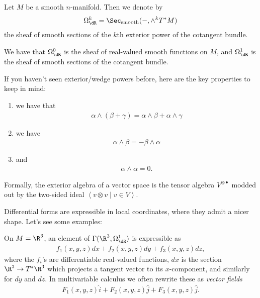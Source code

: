 \documentclass[11pt]{book}
\begin{document}
\begin{definition} Let $M$ be a smooth $n$-manifold. Then we denote by
\begin{align*}
    \Omega^k_{\dR} = \Sec_{\text{smooth}}(-,\wedge^k T^\ast M)
\end{align*}
the sheaf of smooth sections of the $k$th exterior power of the cotangent bundle.
\end{definition}

\begin{example} We have that $\Omega^0_\dR$ is the sheaf of real-valued smooth functions on $M$, and $\Omega^1_\dR$ is the sheaf of smooth sections of the cotangent bundle.
\end{example}

\begin{remark} If you haven't seen exterior/wedge powers before, here are the key properties to keep in mind:
\begin{enumerate}
    \item we have that
    \begin{align*}
        \alpha \wedge (\beta + \gamma) = \alpha \wedge \beta + \alpha \wedge \gamma
    \end{align*}
    \item we have
    \begin{align*}
        \alpha \wedge \beta = - \beta \wedge \alpha
    \end{align*}
    \item and
    \begin{align*}
        \alpha \wedge \alpha = 0.
    \end{align*}
\end{enumerate}
Formally, the exterior algebra of a vector space is the tensor algebra $V^{\otimes \bullet}$ modded out by the two-sided ideal $\left\langle v \otimes v \mid v\in V \right\rangle$.
\end{remark}




Differential forms are expressible in local coordinates, where they admit a nicer shape. Let's see some examples:

\begin{example}\label{exa:1-form-R3-vector-field} 
On $M = \R^3$, an element of $\Gamma(\R^3,\Omega^1_\dR)$ is expressible as
\begin{align*}
    f_1(x,y,z) dx + f_2(x,y,z) dy + f_3(x,y,z) dz,
\end{align*}
where the $f_i$'s are differentiable real-valued functions, $dx$ is the section $\R^3 \to T^\ast \R^3$ which projects a tangent vector to its $x$-component, and similarly for $dy$ and $dz$. In multivariable calculus we often rewrite these as \textit{vector fields}
\begin{align*}
    F_1(x,y,z) \hat{i} + F_2(x,y,z) \hat{j} + F_3(x,y,z) \hat{j}.
\end{align*}
\end{example}
\end{document}
